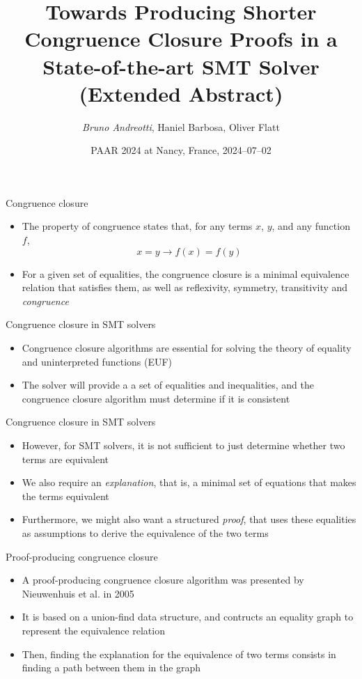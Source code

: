 \documentclass[aspectratio=169]{beamer}
\title[]{Towards Producing Shorter Congruence Closure Proofs in a State-of-the-art SMT Solver (Extended Abstract)}
\author{\emph{Bruno Andreotti}, Haniel Barbosa, Oliver Flatt}
\institute{}
\date{PAAR 2024 at Nancy, France, 2024--07--02}
\newcommand\vitem{\vfill\item}
\newcommand\pvitem{\pause\vfill\item}
\begin{document}
\begin{frame}
  \titlepage
\end{frame}

\begin{frame}{Congruence closure}
  \begin{itemize}
    \item The property of congruence states that, for any terms $x$, $y$, and
    any function $f$,
    $$x = y \rightarrow f(x) = f(y)$$
    \vitem For a given set of equalities, the congruence closure is a minimal
    equivalence relation that satisfies them, as well as reflexivity, symmetry,
    transitivity and \emph{congruence}
  \end{itemize}
\end{frame}

\begin{frame}{Congruence closure in SMT solvers}
  \begin{itemize}
    \item Congruence closure algorithms are essential for solving the theory of
    equality and uninterpreted functions (EUF)
    \vitem The solver will provide a a set of equalities and inequalities, and
    the congruence closure algorithm must determine if it is consistent
  \end{itemize}
\end{frame}

\begin{frame}{Congruence closure in SMT solvers}
  \begin{itemize}
    \item However, for SMT solvers, it is not sufficient to just determine
    whether two terms are equivalent
    \vitem We also require an \textit{explanation}, that is, a minimal set of
    equations that makes the terms equivalent
    \pvitem Furthermore, we might also want a structured \textit{proof}, that
    uses these equalities as assumptions to derive the equivalence of the two
    terms
  \end{itemize}
\end{frame}

\begin{frame}{Proof-producing congruence closure}
  \begin{itemize}
    \item A proof-producing congruence closure algorithm was presented by
    Nieuwenhuis et al. in 2005
    \vitem It is based on a union-find data structure, and contructs an equality
    graph to represent the equivalence relation
    \pvitem Then, finding the explanation for the equivalence of two terms
    consists in finding a path between them in the graph
  \end{itemize}
\end{frame}
\end{document}
